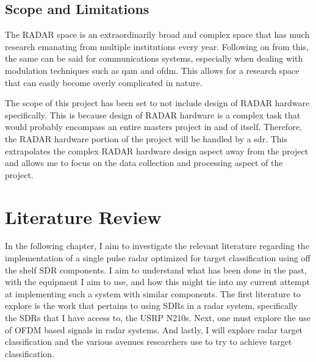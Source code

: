 \documentclass[11pt]{report}
\begin{document}
\section{Scope and Limitations}
The RADAR space is an extraordinarily broad and complex space that has much research emanating from multiple institutions every year. Following on from this, the same can be said for communications systems, especially when dealing with modulation techniques such as \gls{qam} and \gls{ofdm}. This allows for a research space that can easily become overly complicated in nature.


The scope of this project has been set to not include design of RADAR hardware specifically. This is because design of RADAR hardware is a complex task that would probably encompass an entire masters project in and of itself. Therefore, the RADAR hardware portion of the project will be handled by a \gls{sdr}. This extrapolates the complex RADAR hardware design aspect away from the project and allows me to focus on the data collection and processing aspect of the project.


\chapter{Literature Review}\label{ch:Literature}
In the following chapter, I aim to investigate the relevant literature regarding the implementation of a single pulse radar optimized for target classification using off the shelf SDR components. I aim to understand what has been done in the past, with the equipment I aim to use, and how this might tie into my current attempt at implementing such a system with similar components. The first literature to explore is the work that pertains to using SDRs in a radar system, specifically the SDRs that I have access to, the USRP N210s. Next, one must explore the use of OFDM based signals in radar systems. And lastly, I will explore radar target classification and the various avenues researchers use to try to achieve target classification.
\end{document}
